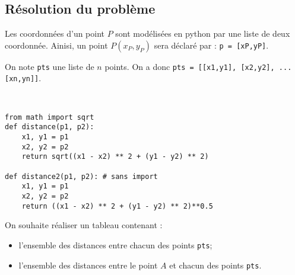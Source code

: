 \subsection*{Résolution du problème}

\ifprof
\else
Les coordonnées d'un point $P$ sont modélisées en python par une liste de deux coordonnée. Ainisi, un point $P(x_P,y_P)$ sera déclaré par : \texttt{p = [xP,yP]}.

On note \texttt{pts} une liste de $n$ points. On a donc \texttt{pts = [[x1,y1], [x2,y2], ... [xn,yn]]}. 
\fi

\ifprof
\begin{corrige}~\\
\vspace{-.5cm}
\begin{lstlisting}
from math import sqrt
def distance(p1, p2):
    x1, y1 = p1
    x2, y2 = p2
    return sqrt((x1 - x2) ** 2 + (y1 - y2) ** 2)

def distance2(p1, p2): # sans import
    x1, y1 = p1
    x2, y2 = p2
    return ((x1 - x2) ** 2 + (y1 - y2) ** 2)**0.5
\end{lstlisting}
\end{corrige}
\else
\fi
\ifprof
\else
\vspace{.25cm}

On souhaite réaliser un tableau contenant :
\begin{itemize}
\item l'ensemble des distances entre chacun des points \texttt{pts};
\item l'ensemble des distances entre le point $A$ et chacun des points \texttt{pts}.
\end{itemize}

